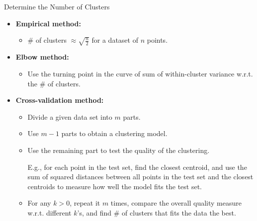\begin{frame}{Determine the Number of Clusters}
	\begin{itemize}
		\item \textbf{Empirical method:}
		      \begin{itemize}
			      \item $\#$ of clusters $\approx \sqrt{\frac{n}{2}}$ for a dataset
			            of $n$ points.
		      \end{itemize}
		\item \textbf{Elbow method:}
		      \begin{itemize}
			      \item Use the turning point in the curve of sum of within-cluster
			            variance w.r.t. the $\#$ of clusters.
		      \end{itemize}
		\item \textbf{Cross-validation method:}
		      \begin{itemize}
			      \item Divide a given data set into $m$ parts.
			      \item Use $m-1$ parts to obtain a clustering model.
			      \item Use the remaining part to test the quality of the clustering.

			            E.g., for each point in the test set, find the closest centroid,
			            and use the sum of squared distances between all points in the
			            test set and the closest centroids to measure how well the model
			            fits the test set.
			      \item For any $k > 0$, repeat it $m$ times, compare the overall
			            quality measure w.r.t. different $k$'s, and find $\#$ of clusters
			            that fits the data the best.
		      \end{itemize}
	\end{itemize}
\end{frame}

